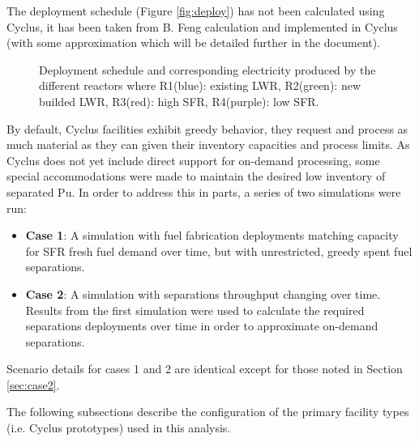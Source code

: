 \documentclass[12pt]{article}
\begin{document}

The deployment schedule (Figure \ref{fig:deploy}) has not been calculated
using Cyclus, it has been taken from B. Feng calculation and implemented in
Cyclus (with some approximation which will be detailed further in the
document).

\begin{figure}[h!]
    \centering
    \caption{
        Deployment schedule and corresponding electricity produced by the
        different reactors where R1(blue): existing LWR, R2(green): new
        builded LWR, R3(red): high SFR, R4(purple): low
        SFR.\label{fig:deployment}
    }
\end{figure}

By default, Cyclus facilities exhibit greedy behavior, they request and
process as much material as they can given their inventory capacities and
process limits.  As Cyclus does not yet include direct support for on-demand
processing, some special accommodations were made to maintain the desired low
inventory of separated Pu.  In order to address this in parts, a series of two
simulations were run:

\begin{itemize}

    \item \textbf{Case 1}: A simulation with fuel fabrication deployments
        matching capacity for SFR fresh fuel demand over time, but with
        unrestricted, greedy spent fuel separations.

    \item \textbf{Case 2}: A simulation with separations throughput changing
        over time. Results from the first simulation were used to calculate
        the required separations deployments over time in order to approximate
        on-demand separations.

\end{itemize}

Scenario details for cases 1 and 2 are identical except for those noted in
Section \ref{sec:case2}.

The following subsections describe the configuration of the primary facility
types (i.e. Cyclus prototypes) used in this analysis.
\end{document}
